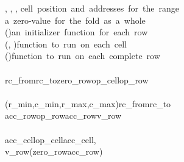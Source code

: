 \begin{hscode}\SaveRestoreHook
{}%
%
%
%
%
%
%
%
\>[B]{}\mathbin{::}{}\<[15]%
\>[15]{}\llparenthesis \cdot , \cdot \rrparenthesis \to \llparenthesis \cdot , \cdot \rrparenthesis \to \llparenthesis \cdot , \cdot \rrparenthesis {}\<[40]%
\>[40]{}\mbox{\onelinecomment  cell position and addresses for the range}{}\<[E]%
\\
\>[15]{}\to {}\<[40]%
\>[40]{}\mbox{\onelinecomment  a zero-value for the fold as a whole}{}\<[E]%
\\
\>[15]{}\to (\to {}){}\<[40]%
\>[40]{}\mbox{\onelinecomment  an initializer function for each row}{}\<[E]%
\\
\>[15]{}\to (\to \llparenthesis \cdot , \cdot \rrparenthesis \to {}){}\<[40]%
\>[40]{}\mbox{\onelinecomment  function to run on each cell}{}\<[E]%
\\
\>[15]{}\to (\to {}\to {}\to {}){}\<[40]%
\>[40]{}\mbox{\onelinecomment  function to run on each complete row}{}\<[E]%
\\
\>[15]{}\to {}\<[E]%
\\
\>[B]{}\;\;rc_{from}\;rc_{to}\;\;zero_{row}\;op_{cell}\;op_{row}\mathrel{=}{}\<[E]%
\\
\>[B]{}\<[4]%
\>[4]{}\<[E]%
\\
\>[4]{}\<[7]%
\>[7]{}(r_{min},c_{min},r_{max},c_{max})\mathrel{=}\;\;rc_{from}\;rc_{to}{}\<[E]%
\\
\>[4]{}\<[7]%
\>[7]{}\;acc_{row}\;\mathrel{=}op_{row}\;acc_{row}\;\;v_{row}{}\<[E]%
\\
\>[7]{}\<[10]%
\>[10]{}\<[E]%
\\
\>[10]{}\<[13]%
\>[13]{}\;acc_{cell}\;\mathrel{=}op_{cell}\;acc_{cell}\;\llparenthesis \langle {}\rangle , \langle {}\rangle \rrparenthesis {}\<[E]%
\\
\>[10]{}\<[13]%
\>[13]{}v_{row}\mathrel{=}\;\;(zero_{row}\;acc_{row})\<[E]%
\\
\>[B]{}\<[4]%
\>[4]{}\<[E]%
\\
\>[4]{}\<[7]%
\>[7]{}\;\;\<[E]%
\ColumnHook
\end{hscode}\resethooks

